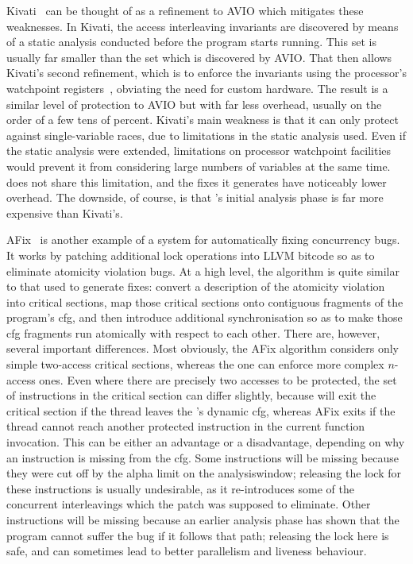 Kivati~\cite{Chew2010} can be thought of as a refinement to AVIO which
mitigates these weaknesses.  In Kivati, the access interleaving
invariants are discovered by means of a static analysis conducted
before the program starts running.  This set is usually far smaller
than the set which is discovered by AVIO.  That then allows Kivati's
second refinement, which is to enforce the invariants using the
processor's watchpoint registers~\cite[Chapter 16.2: Debug
  Registers]{Intel2009}, obviating the need for custom hardware.  The
result is a similar level of protection to AVIO but with far less
overhead, usually on the order of a few tens of percent.  Kivati's
main weakness is that it can only protect against single-variable
races, due to limitations in the static analysis used.  Even if the
static analysis were extended, limitations on processor watchpoint
facilities would prevent it from considering large numbers of
variables at the same time.  {\Technique} does not share this
limitation, and the fixes it generates have noticeably lower overhead.
The downside, of course, is that {\technique}'s initial analysis phase
is far more expensive than Kivati's.

AFix~\cite{Jin2011} is another example of a system for automatically
fixing concurrency bugs.  It works by patching additional lock
operations into LLVM bitcode so as to eliminate atomicity violation
bugs.  At a high level, the algorithm is quite similar to that used to
generate {\technique} fixes: convert a description of the atomicity
violation into critical sections, map those critical sections onto
contiguous fragments of the program's \gls{cfg}, and then introduce
additional synchronisation so as to make those \gls{cfg} fragments run
atomically with respect to each other.  There are, however, several
important differences.  Most obviously, the AFix algorithm considers
only simple two-access critical sections, whereas the {\technique} one
can enforce more complex $n$-access ones.  Even where there are
precisely two accesses to be protected, the set of instructions in the
critical section can differ slightly, because {\technique} will exit
the critical section if the thread leaves the {\StateMachine}'s
dynamic \gls{cfg}, whereas AFix exits if the thread cannot reach
another protected instruction in the current function invocation.
This can be either an advantage or a disadvantage, depending on why an
instruction is missing from the {\StateMachine} \gls{cfg}.  Some
instructions will be missing because they were cut off by the
\gls{alpha} limit on the \gls{analysiswindow}; releasing the lock for
these instructions is usually undesirable, as it re-introduces some of
the concurrent interleavings which the patch was supposed to
eliminate.  Other instructions will be missing because an earlier
analysis phase has shown that the program cannot suffer the bug if it
follows that path; releasing the lock here is safe, and can sometimes
lead to better parallelism and liveness behaviour.

